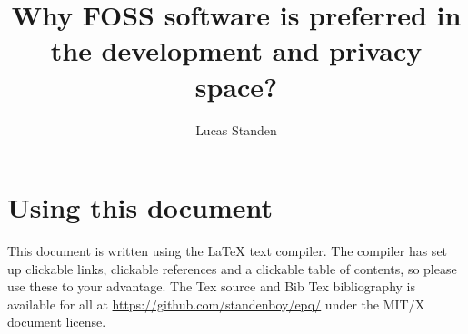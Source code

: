 \documentclass[a4paper,12pt]{article}
\author{Lucas Standen}
\title{Why FOSS software is preferred in the development and privacy space?}
\begin{document}
\maketitle

\newpage

\section{Using this document}
This document is written using the {\LaTeX} text compiler. The compiler has set up clickable links,
clickable references and a clickable table of contents, so please use these to your advantage. 
The Tex source and Bib Tex bibliography is available for all at 
\url{https://github.com/standenboy/epq/} under the MIT/X document license.

\tableofcontents
\newpage

\setlength{\parskip}{1em}
\end{document}
